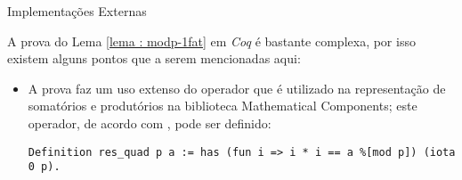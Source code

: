 \begin{frame}[fragile]{Implementações Externas}
    
    A prova do Lema \ref{lema : modp-1fat} em \textit{Coq} é bastante complexa, por isso existem alguns pontos que a serem mencionadas aqui:

    \begin{itemize}
        \item A prova faz um uso extenso do operador  que é utilizado na representação de somatórios e produtórios na biblioteca Mathematical Components; este operador, de acordo com \cite{assia_mahboubi_2022_7118596}, pode ser definido:
        
        \begin{lstlisting}[language=coq,frame=single,tabsize=1]
Definition res_quad p a := has (fun i => i * i == a %[mod p]) (iota 0 p).
        \end{lstlisting}
        
        
    \end{itemize}
    
\end{frame}